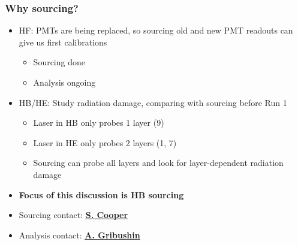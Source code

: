\documentclass[bigger]{beamer}
\providecommand{\alert}[1]{\textbf{#1}}
\begin{document}
\begin{frame}
\frametitle{Why sourcing?}
\label{sec-2-1-2}
\begin{itemize}

\item HF: PMTs are being replaced, so sourcing old and new PMT readouts can give us first calibrations
\label{sec-2-1-2-1}%
\begin{itemize}

\item Sourcing done
\label{sec-2-1-2-1-1}%

\item Analysis ongoing
\label{sec-2-1-2-1-2}%
\end{itemize} %

\item HB/HE: Study radiation damage, comparing with sourcing before Run 1
\label{sec-2-1-2-2}%
\begin{itemize}

\item Laser in HB only probes 1 layer (9)
\label{sec-2-1-2-2-1}%

\item Laser in HE only probes 2 layers (1, 7)
\label{sec-2-1-2-2-2}%

\item Sourcing can probe all layers and look for layer-dependent radiation damage
\label{sec-2-1-2-2-3}%
\end{itemize} %

\item \alert{Focus of this discussion is HB sourcing}
\label{sec-2-1-2-3}%

\item Sourcing contact: \href{mailto:seth.cooper@cern.ch}{\underline{\alert{S. Cooper}}}
\label{sec-2-1-2-4}%

\item Analysis contact: \href{mailto:andrei.gribushin@cern.ch}{\underline{\alert{A. Gribushin}}}
\label{sec-2-1-2-5}%
\end{itemize} %
\end{frame}
\end{document}
